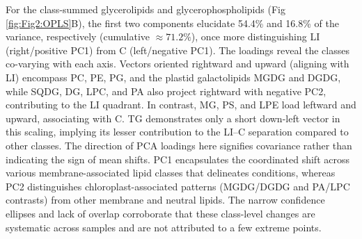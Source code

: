 \documentclass[10pt,letterpaper]{article}
\begin{document}
\begin{itemize}
For the class-summed glycerolipids and glycerophospholipids (Fig \ref{fig:Fig2:OPLS}B), the first two components elucidate 54.4\% and 16.8\% of the variance, respectively (cumulative $\approx 71.2\%$), once more distinguishing LI (right/positive PC1) from C (left/negative PC1). The loadings reveal the classes co-varying with each axis. Vectors oriented rightward and upward (aligning with LI) encompass PC, PE, PG, and the plastid galactolipids MGDG and DGDG, while SQDG, DG, LPC, and PA also project rightward with negative PC2, contributing to the LI quadrant. In contrast, MG, PS, and LPE load leftward and upward, associating with C. TG demonstrates only a short down-left vector in this scaling, implying its lesser contribution to the LI–C separation compared to other classes. The direction of PCA loadings here signifies covariance rather than indicating the sign of mean shifts. PC1 encapsulates the coordinated shift across various membrane-associated lipid classes that delineates conditions, whereas PC2 distinguishes chloroplast-associated patterns (MGDG/DGDG and PA/LPC contrasts) from other membrane and neutral lipids. The narrow confidence ellipses and lack of overlap corroborate that these class-level changes are systematic across samples and are not attributed to a few extreme points. 





\end{itemize}
\end{document}
